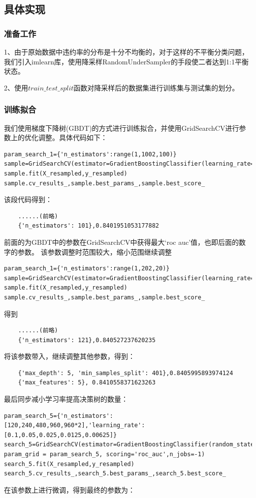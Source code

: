 \documentclass[UTF8,a4paper,10pt]{ctexart}
\begin{document}
\subsection{具体实现}
\subsubsection{准备工作}
1、由于原始数据中违约率的分布是十分不均衡的，对于这样的不平衡分类问题，我们引入imlearn库，使用降采样RandomUnderSampler的手段使二者达到1:1平衡状态。

2、使用$train\_test\_split$函数对降采样后的数据集进行训练集与测试集的划分。

\subsubsection{训练拟合}
我们使用梯度下降树(GBDT)的方式进行训练拟合，并使用GridSearchCV进行参数上的优化调整。具体代码如下：
\begin{lstlisting}
param_search_1={'n_estimators':range(1,1002,100)}
sample=GridSearchCV(estimator=GradientBoostingClassifier(learning_rate=0.1,random_state=10),param_grid=param_search_1,scoring='roc_auc',n_jobs=-1,return_train_score=True,refit=True)
sample.fit(X_resampled,y_resampled)
sample.cv_results_,sample.best_params_,sample.best_score_
\end{lstlisting}
该段代码得到：
\begin{lstlisting}
	......(前略)
	{'n_estimators': 101},0.8401951053177882
\end{lstlisting}
前面的为GBDT中的参数在GridSearchCV中获得最大‘roc auc’值，也即后面的数字的参数。
该参数调整时范围较大，缩小范围继续调整
\begin{lstlisting}
param_search_1={'n_estimators':range(1,202,20)}
sample=GridSearchCV(estimator=GradientBoostingClassifier(learning_rate=0.1,random_state=10),param_grid=param_search_1,scoring='roc_auc',n_jobs=-1,return_train_score=True,refit=True)
sample.fit(X_resampled,y_resampled)
sample.cv_results_,sample.best_params_,sample.best_score_
\end{lstlisting}
得到
\begin{lstlisting}
	......(前略)
	{'n_estimators': 121},0.840527237620235
\end{lstlisting}

将该参数带入，继续调整其他参数，得到：
\begin{lstlisting}
	{'max_depth': 5, 'min_samples_split': 401},0.8405995893974124
	{'max_features': 5}, 0.8410558371623263
\end{lstlisting}
最后同步减小学习率提高决策树的数量：
\begin{lstlisting}
param_search_5={'n_estimators':[120,240,480,960,960*2],'learning_rate':[0.1,0.05,0.025,0.0125,0.00625]}
search_5=GridSearchCV(estimator=GradientBoostingClassifier(random_state=10,min_samples_split=401,max_depth=5,max_features=3), param_grid = param_search_5, scoring='roc_auc',n_jobs=-1)
search_5.fit(X_resampled,y_resampled)
search_5.cv_results_,search_5.best_params_,search_5.best_score_
\end{lstlisting}
在该参数上进行微调，得到最终的参数为：
\end{document}
